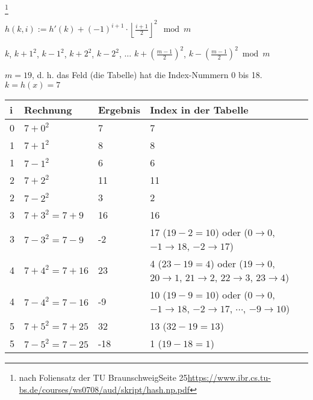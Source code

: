 \documentclass{lehramt-informatik-aufgabe}
\begin{document}

\footnote{nach Foliensatz der TU BraunschweigSeite 25\url{https://www.ibr.cs.tu-bs.de/courses/ws0708/aud/skript/hash.np.pdf}}


$h(k, i) := h'(k) + (-1)^{i+1} \cdot \left\lfloor \frac{i+1}{2}\right\rfloor ^2 \mod m$

$k$, $k+1^2$, $k-1^2$, $k+2^2$, $k-2^2$,
$\ldots$
$k+(\frac{m-1}{2})^2$, $k-(\frac{m-1}{2})^2 \bmod m$


$m=19$, d. h. das Feld (die Tabelle) hat die Index-Nummern 0 bis 18.
$k = h(x) = 7$


\def\tmp#1{{\tiny#1}}

\begin{tabular}{|l|l|l|l|}
i & Rechnung & Ergebnis & Index in der Tabelle\\\hline\hline
0 & $7 + 0^2$ & 7 & 7\\
1 & $7 + 1^2$ & 8 & 8\\
1 & $7 - 1^2$ & 6 & 6\\
2 & $7 + 2^2$ & 11 & 11\\
2 & $7 - 2^2$ & 3 & 2 \\
3 & $7 + 3^2 = 7 + 9$  & 16 & 16 \\

3 & $7 - 3^2 = 7 - 9$  & -2 &
17 \tmp{($19-2=10$) oder ($0 \rightarrow 0$, $-1 \rightarrow 18$, $-2 \rightarrow 17$)}
\\

4 & $7 + 4^2 = 7 + 16$  & 23 &
4 \tmp{($23-19=4$) oder ($19 \rightarrow 0$, $20 \rightarrow 1$, $21 \rightarrow 2$, $22 \rightarrow 3$, $23 \rightarrow 4$)}
\\

4 & $7 - 4^2 = 7 - 16$  & -9 &
10 \tmp{($19-9=10$) oder ($0 \rightarrow 0$, $-1 \rightarrow 18$, $-2 \rightarrow 17$, $\cdots$, $-9 \rightarrow 10$)}
\\

5 & $7 + 5^2 = 7 + 25$  & 32 & 13 \tmp{($32-19=13$)} \\
5 & $7 - 5^2 = 7 - 25$  & -18 & 1 \tmp{($19-18=1$)}\\
\end{tabular}
\end{document}
